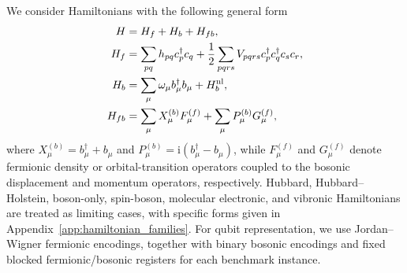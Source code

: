 \documentclass[
  reprint,
  amsmath,
  amssymb,
  aps,
  pra,
  nofootinbib,
  superscriptaddress,
  floatfix
]{revtex4-2}
\newcommand{\ii}{\mathrm{i}}
\begin{document}
We consider Hamiltonians with the following general form\cite{Dutta2024BosonicChemistry,Peng2025BosonHamiltonians}
\begin{align}
H&=H_f+H_b+H_{fb},
\nonumber\\
H_f&=\sum_{pq}h_{pq}c_p^\dagger c_q
+\frac12\sum_{pqrs}V_{pqrs}c_p^\dagger c_q^\dagger c_s c_r,
\nonumber\\
H_b&=\sum_{\mu}\omega_\mu b_\mu^\dagger b_\mu+H_b^{\rm nl},
\nonumber\\
H_{fb}&=\sum_{\mu}X_\mu^{(b)}F_\mu^{(f)}
+\sum_{\mu}P_\mu^{(b)}G_\mu^{(f)},
\label{eq:general_fb_terms_static}
\end{align}
where $X_\mu^{(b)}=b_\mu^\dagger+b_\mu$ and $P_\mu^{(b)}=\ii(b_\mu^\dagger-b_\mu)$, while $F_\mu^{(f)}$ and $G_\mu^{(f)}$ denote fermionic density or orbital-transition operators coupled to the bosonic displacement and momentum operators, respectively. Hubbard, Hubbard--Holstein, boson-only, spin-boson, molecular electronic, and vibronic Hamiltonians are treated as limiting cases, with specific forms given in Appendix~\ref{app:hamiltonian_families}. For qubit representation, we use Jordan--Wigner fermionic encodings, together with binary bosonic encodings and fixed blocked fermionic/bosonic registers for each benchmark instance.
\end{document}
